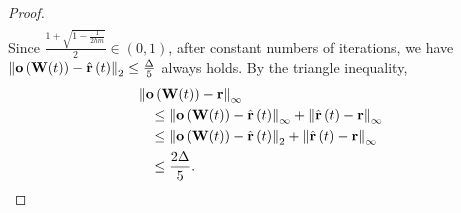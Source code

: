 \begin{proof}
\begin{equation*}
\begin{split}
\end{split}
\end{equation*}
Since $\frac{1 + \sqrt{1 - \frac{1}{2 h m}}}{2} \in \left(0, 1\right)$, after constant numbers of iterations, we have $\left\| {\mathbf{o}}\left( {\mathbf{W}}(t) \right) - \hat{{\mathbf{r}}}\left(t\right)\right\|_2 \le \frac{\Delta}{5}$ always holds. By the triangle inequality,
\begin{equation*}
\begin{split}
    &\left\| {\mathbf{o}}\left( {\mathbf{W}}(t) \right) - {\mathbf{r}} \right\|_\infty \\
    &\quad \le \left\| {\mathbf{o}}\left( {\mathbf{W}}(t) \right) - \hat{{\mathbf{r}}}\left(t\right)\right\|_\infty + \left\| \hat{{\mathbf{r}}}\left(t\right) - {\mathbf{r}}\right\|_\infty \\
    &\quad \le \left\| {\mathbf{o}}\left( {\mathbf{W}}(t) \right) - \hat{{\mathbf{r}}}\left(t\right)\right\|_2 + \left\| \hat{{\mathbf{r}}}\left(t\right) - {\mathbf{r}}\right\|_\infty \\
    &\quad \le \frac{2 \Delta}{5}.
\end{split}
\end{equation*}
\end{proof}